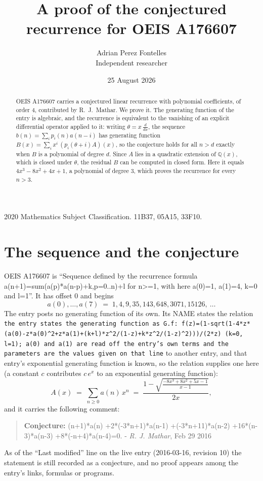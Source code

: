 \documentclass[11pt,a4paper]{article}
\title{A proof of the conjectured recurrence for OEIS A176607}
\author{Adrian Perez Fontelles\\ \small Independent researcher}
\date{25 August 2026}
\theoremstyle{plain}
\theoremstyle{definition}
\begin{document}
\maketitle

\begin{abstract}
OEIS A176607 carries a conjectured linear recurrence with polynomial coefficients, of
order 4, contributed by R.~J.~Mathar. We prove it. The generating function of the
entry is algebraic, and the recurrence is equivalent to the vanishing of an explicit
differential operator applied to it: writing $\theta=x\,\frac{d}{dx}$, the sequence
$b(n)=\sum_{i}p_{i}(n)a(n-i)$ has generating function
$B(x)=\sum_{i}x^{i}\,(p_{i}(\theta+i)A)(x)$, so the conjecture holds for all $n>d$ exactly
when $B$ is a polynomial of degree $d$. Since $A$ lies in a quadratic extension of
$\mathbb{Q}(x)$, which is closed under $\theta$, the residual $B$ can be computed in
closed form. Here it equals $4 x^{3} - 8 x^{2} + 4 x + 1$, a polynomial of degree $3$, which proves
the recurrence for every $n>3$.
\end{abstract}

\noindent\small 2020 Mathematics Subject Classification. 11B37, 05A15, 33F10.\normalsize

\section{The sequence and the conjecture}

OEIS A176607 is ``Sequence defined by the recurrence formula a(n+1)=sum(a(p)*a(n-p)+k,p=0..n)+l for n>=1, with here a(0)=1, a(1)=4, k=0 and l=1''. It has offset $0$ and begins
\[
a(0),\dots,a(7)\;=\;1, 4, 9, 35, 143, 648, 3071, 15126,\ \dots
\]
The entry posts no generating function of its own. Its NAME states the
relation \texttt{the entry states the generating function as G.f: f(z)=(1-sqrt(1-4*z*(a(0)-z*a(0)\textasciicircum{}2+z*a(1)+(k+l)*z\textasciicircum{}2/(1-z)+k*z\textasciicircum{}2/(1-z)\textasciicircum{}2)))/(2*z) (k=0, l=1); a(0) and a(1) are read off the entry's own terms and the parameters are the values given on that line} to another entry, and that entry's exponential generating
function is known, so the relation supplies one here (a constant $c$ contributes
$c\,e^{x}$ to an exponential generating function):
\begin{equation}\label{eq:gf}
A(x)\;=\;\sum_{n\ge 0} a(n)\,x^{n}\;=\;\frac{1 - \sqrt{\frac{- 8 x^{3} + 8 x^{2} + 5 x - 1}{x - 1}}}{2 x} ,
\end{equation}
and it carries the following comment:
\begin{quote}\small
\textbf{Conjecture:} (n+1)*a(n) +2*(-3*n+1)*a(n-1) +(-3*n+11)*a(n-2) +16*(n-3)*a(n-3) +8*(-n+4)*a(n-4)=0. - \emph{R. J. Mathar}, Feb 29 2016
\end{quote}
As of the ``Last modified'' line on the live entry (2016-03-16, revision 10) the
statement is still recorded as a conjecture, and no proof appears among the entry's links,
formulas or programs.
\end{document}
